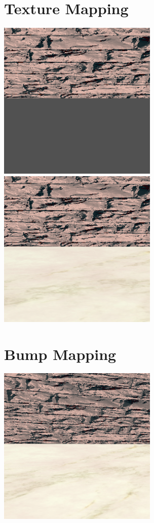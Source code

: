 \documentclass{article}
\begin{document}
\section{Texture Mapping}
\includegraphics[width=3in]{Assets/no_texture_mapping.png}
\includegraphics[width=3in]{Assets/texture_mapping.png}

\section{Bump Mapping}
\includegraphics[width=3in]{Assets/bump_mapping.png}
\end{document}
